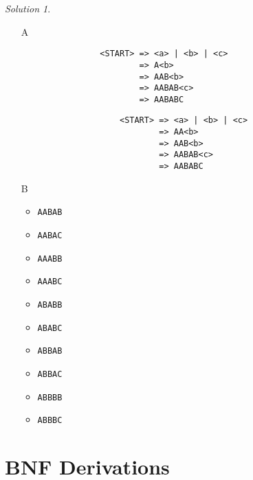 \documentclass{article}
\theoremstyle{remark} \newtheorem*{solution}{Solution}
\begin{document}
\begin{solution}
\indent
    \begin{itemize}
        \item[A] \indent
            \begin{lstlisting}
                <START> => <a> | <b> | <c>
                        => A<b>
                        => AAB<b>
                        => AABAB<c>
                        => AABABC
            \end{lstlisting}

                \begin{lstlisting}
                    <START> => <a> | <b> | <c>
                            => AA<b>
                            => AAB<b>
                            => AABAB<c>
                            => AABABC
                \end{lstlisting}
        \item[B] 
            \begin{itemize}
              \item \texttt{AABAB}
              \item \texttt{AABAC}
              \item \texttt{AAABB}
              \item \texttt{AAABC}
              \item \texttt{ABABB}
              \item \texttt{ABABC}
              \item \texttt{ABBAB}
              \item \texttt{ABBAC}
              \item \texttt{ABBBB}
              \item \texttt{ABBBC}
           \end{itemize}
            
    \end{itemize}
\end{solution}

\pagebreak
\section{BNF Derivations}
\end{document}
